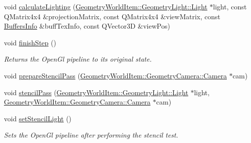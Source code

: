 \begin{DoxyCompactItemize}
\item 
void \mbox{\hyperlink{class_geometry_engine_1_1_geometry_render_step_1_1_lighting_pass_aa30f6513bececfbaeb5ce7ec7e0d370d}{calculate\+Lighting}} (\mbox{\hyperlink{class_geometry_engine_1_1_geometry_world_item_1_1_geometry_light_1_1_light}{Geometry\+World\+Item\+::\+Geometry\+Light\+::\+Light}} $\ast$light, const Q\+Matrix4x4 \&projection\+Matrix, const Q\+Matrix4x4 \&view\+Matrix, const \mbox{\hyperlink{class_geometry_engine_1_1_buffers_info}{Buffers\+Info}} \&buff\+Tex\+Info, const Q\+Vector3D \&view\+Pos)
\item 
\mbox{\label{class_geometry_engine_1_1_geometry_render_step_1_1_lighting_pass_a980473c9d2e2e77ebdce9e56454f3d3f}} 
void \mbox{\hyperlink{class_geometry_engine_1_1_geometry_render_step_1_1_lighting_pass_a980473c9d2e2e77ebdce9e56454f3d3f}{finish\+Step}} ()
\begin{DoxyCompactList}\small\item\em Returns the Open\+Gl pipeline to its original state. \end{DoxyCompactList}\item 
void \mbox{\hyperlink{class_geometry_engine_1_1_geometry_render_step_1_1_lighting_pass_a1a3280c28b0750c7cad03f01d37374c7}{prepare\+Stencil\+Pass}} (\mbox{\hyperlink{class_geometry_engine_1_1_geometry_world_item_1_1_geometry_camera_1_1_camera}{Geometry\+World\+Item\+::\+Geometry\+Camera\+::\+Camera}} $\ast$cam)
\item 
void \mbox{\hyperlink{class_geometry_engine_1_1_geometry_render_step_1_1_lighting_pass_a42b7f335d4bebdbdd06c3bef142844c0}{stencil\+Pass}} (\mbox{\hyperlink{class_geometry_engine_1_1_geometry_world_item_1_1_geometry_light_1_1_light}{Geometry\+World\+Item\+::\+Geometry\+Light\+::\+Light}} $\ast$light, \mbox{\hyperlink{class_geometry_engine_1_1_geometry_world_item_1_1_geometry_camera_1_1_camera}{Geometry\+World\+Item\+::\+Geometry\+Camera\+::\+Camera}} $\ast$cam)
\item 
\mbox{\label{class_geometry_engine_1_1_geometry_render_step_1_1_lighting_pass_a576001cdaa8f2a377b926d9bcd7b2444}} 
void \mbox{\hyperlink{class_geometry_engine_1_1_geometry_render_step_1_1_lighting_pass_a576001cdaa8f2a377b926d9bcd7b2444}{set\+Stencil\+Light}} ()
\begin{DoxyCompactList}\small\item\em Sets the Open\+Gl pipeline after performing the stencil test. \end{DoxyCompactList}\item 

\end{DoxyCompactItemize}
